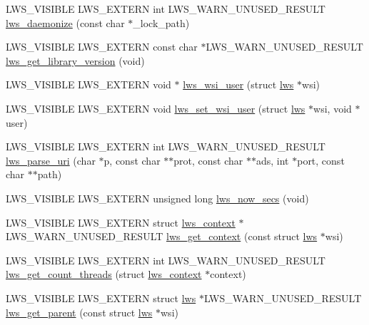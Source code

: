 \begin{DoxyCompactItemize}
\item 
L\+W\+S\+\_\+\+V\+I\+S\+I\+B\+LE L\+W\+S\+\_\+\+E\+X\+T\+E\+RN int L\+W\+S\+\_\+\+W\+A\+R\+N\+\_\+\+U\+N\+U\+S\+E\+D\+\_\+\+R\+E\+S\+U\+LT \hyperlink{group__misc_gace5171b1dbbc03ec89a98f8afdb5c9af}{lws\+\_\+daemonize} (const char $\ast$\+\_\+lock\+\_\+path)
\item 
L\+W\+S\+\_\+\+V\+I\+S\+I\+B\+LE L\+W\+S\+\_\+\+E\+X\+T\+E\+RN const char $\ast$L\+W\+S\+\_\+\+W\+A\+R\+N\+\_\+\+U\+N\+U\+S\+E\+D\+\_\+\+R\+E\+S\+U\+LT \hyperlink{group__misc_gac6abfc0b2bd5b2f09281a4432bb2f5f0}{lws\+\_\+get\+\_\+library\+\_\+version} (void)
\item 
L\+W\+S\+\_\+\+V\+I\+S\+I\+B\+LE L\+W\+S\+\_\+\+E\+X\+T\+E\+RN void $\ast$ \hyperlink{group__misc_gaa194584fff9698f3b280658f770ccd0f}{lws\+\_\+wsi\+\_\+user} (struct \hyperlink{structlws}{lws} $\ast$wsi)
\item 
L\+W\+S\+\_\+\+V\+I\+S\+I\+B\+LE L\+W\+S\+\_\+\+E\+X\+T\+E\+RN void \hyperlink{group__misc_ga8d23abbe3fe1d53592b29c597a8245ba}{lws\+\_\+set\+\_\+wsi\+\_\+user} (struct \hyperlink{structlws}{lws} $\ast$wsi, void $\ast$user)
\item 
L\+W\+S\+\_\+\+V\+I\+S\+I\+B\+LE L\+W\+S\+\_\+\+E\+X\+T\+E\+RN int L\+W\+S\+\_\+\+W\+A\+R\+N\+\_\+\+U\+N\+U\+S\+E\+D\+\_\+\+R\+E\+S\+U\+LT \hyperlink{group__misc_ga1ec0d9faac5d3a5824d765c287c043aa}{lws\+\_\+parse\+\_\+uri} (char $\ast$p, const char $\ast$$\ast$prot, const char $\ast$$\ast$ads, int $\ast$port, const char $\ast$$\ast$path)
\item 
L\+W\+S\+\_\+\+V\+I\+S\+I\+B\+LE L\+W\+S\+\_\+\+E\+X\+T\+E\+RN unsigned long \hyperlink{group__misc_ga33bf2635033710b25f931b57ed663e1e}{lws\+\_\+now\+\_\+secs} (void)
\item 
L\+W\+S\+\_\+\+V\+I\+S\+I\+B\+LE L\+W\+S\+\_\+\+E\+X\+T\+E\+RN struct \hyperlink{structlws__context}{lws\+\_\+context} $\ast$L\+W\+S\+\_\+\+W\+A\+R\+N\+\_\+\+U\+N\+U\+S\+E\+D\+\_\+\+R\+E\+S\+U\+LT \hyperlink{group__misc_ga0af4f7d2dd375aeedcfa7eb0e1101c4b}{lws\+\_\+get\+\_\+context} (const struct \hyperlink{structlws}{lws} $\ast$wsi)
\item 
L\+W\+S\+\_\+\+V\+I\+S\+I\+B\+LE L\+W\+S\+\_\+\+E\+X\+T\+E\+RN int L\+W\+S\+\_\+\+W\+A\+R\+N\+\_\+\+U\+N\+U\+S\+E\+D\+\_\+\+R\+E\+S\+U\+LT \hyperlink{group__misc_ga629f48268fd1856b54b11172991b97d9}{lws\+\_\+get\+\_\+count\+\_\+threads} (struct \hyperlink{structlws__context}{lws\+\_\+context} $\ast$context)
\item 
L\+W\+S\+\_\+\+V\+I\+S\+I\+B\+LE L\+W\+S\+\_\+\+E\+X\+T\+E\+RN struct \hyperlink{structlws}{lws} $\ast$L\+W\+S\+\_\+\+W\+A\+R\+N\+\_\+\+U\+N\+U\+S\+E\+D\+\_\+\+R\+E\+S\+U\+LT \hyperlink{group__misc_gafdbca442411f4af9753ab9738a4973d4}{lws\+\_\+get\+\_\+parent} (const struct \hyperlink{structlws}{lws} $\ast$wsi)
$$
\end{DoxyCompactItemize}
